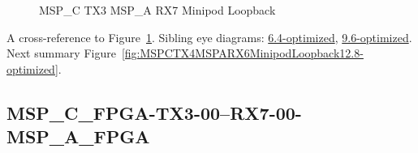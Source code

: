 \begin{figure}[h]
\begin{subfigure}{0.33\textwidth}
\hyperref[sec:MSPCFPGATX306RX706MSPAFPGA12.8-optimized]{}
\end{subfigure}\hspace*{\fill}
\begin{subfigure}{0.33\textwidth}
\hyperref[sec:MSPCFPGATX307RX707MSPAFPGA12.8-optimized]{}
\end{subfigure}\hspace*{\fill}
\begin{subfigure}{0.33\textwidth}
\hyperref[sec:MSPCFPGATX308RX708MSPAFPGA12.8-optimized]{}
\end{subfigure}

\begin{subfigure}{0.33\textwidth}
\hyperref[sec:MSPCFPGATX309RX709MSPAFPGA12.8-optimized]{}
\end{subfigure}\hspace*{\fill}
\begin{subfigure}{0.33\textwidth}
\hyperref[sec:MSPCFPGATX310RX710MSPAFPGA12.8-optimized]{}
\end{subfigure}\hspace*{\fill}
\begin{subfigure}{0.33\textwidth}
\hyperref[sec:MSPCFPGATX311RX711MSPAFPGA12.8-optimized]{}
\end{subfigure}

\caption{MSP\_C TX3 MSP\_A RX7 Minipod Loopback} \label{fig:MSPCTX3MSPARX7MinipodLoopback12.8-optimized}
\end{figure}

A cross-reference to Figure~\ref{fig:MSPCTX3MSPARX7MinipodLoopback12.8-optimized}.
Sibling eye diagrams: \hyperref[sec:MSPCTX3MSPARX7MinipodLoopback6.4-optimized]{6.4-optimized}, \hyperref[sec:MSPCTX3MSPARX7MinipodLoopback9.6-optimized]{9.6-optimized}. \\
Next summary Figure~\ref{fig:MSPCTX4MSPARX6MinipodLoopback12.8-optimized}.
\clearpage
% 
\subsection{MSP\_C\_FPGA-TX3-00--RX7-00-MSP\_A\_FPGA}\label{sec:MSPCFPGATX300RX700MSPAFPGA12.8-optimized}

